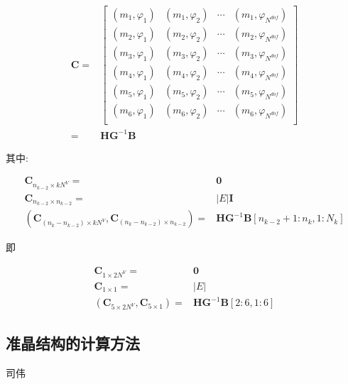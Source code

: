 \begin{equation*}
\begin{aligned}
\mathbf C =& \begin{bmatrix}
(m_1, \varphi_1) & (m_1, \varphi_2) & \cdots & (m_1, \varphi_{N^{dof}}) \\
(m_2, \varphi_1) & (m_2, \varphi_2) & \cdots & (m_2, \varphi_{N^{dof}})\\
(m_{3}, \varphi_1) & (m_{3}, \varphi_2) & \cdots & (m_{3},\varphi_{N^{dof}})\\
(m_4, \varphi_1) & (m_4, \varphi_2) & \cdots & (m_4,\varphi_{N^{dof}})\\
(m_5, \varphi_1) & (m_5, \varphi_2) & \cdots & (m_5,\varphi_{N^{dof}})\\
(m_6, \varphi_1) & (m_6, \varphi_2) & \cdots & (m_6,\varphi_{N^{dof}})\\
\end{bmatrix}\\
=& \mathbf H\mathbf G^{-1}\mathbf B
\end{aligned}
\end{equation*}

其中:

\begin{equation*}
\begin{aligned}
\mathbf C_{n_{k-2}\times kN^V} = & \mathbf 0 \\
\mathbf C_{n_{k-2}\times n_{k-2}} = &|E| \mathbf I\\
(\mathbf C_{(n_{k} - n_{k-2})\times kN^V}, \mathbf C_{(n_{k} - n_{k-2})\times n_{k-2}}) = & \mathbf H\mathbf G^{-1}\mathbf B[n_{k-2}+1:n_k,1:N_k]
\end{aligned}
\end{equation*}


即

\begin{equation*}
\begin{aligned}
\mathbf C_{1 \times 2N^V} =& \mathbf 0 \\
\mathbf C_{1 \times 1} =& |E| \\
(\mathbf C_{5 \times 2N^V}, \mathbf C_{5 \times 1}) =& \mathbf H \mathbf G^{-1} \mathbf B[2:6, 1:6]
\end{aligned}
\end{equation*}

\subsection{准晶结构的计算方法}
{\color{red}\begin{center}
    司伟
\end{center}}
